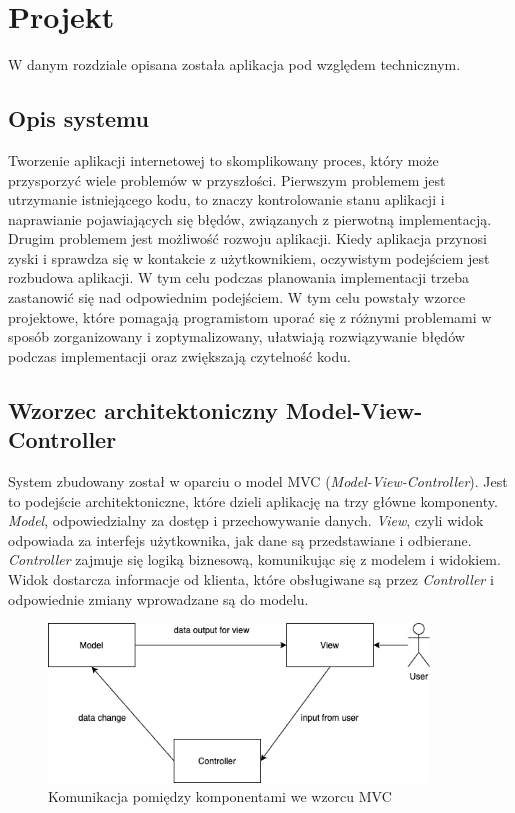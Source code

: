 \chapter{Projekt}
\thispagestyle{chapterBeginStyle}
W danym rozdziale opisana została aplikacja pod względem technicznym. 

\section{Opis systemu}
Tworzenie aplikacji internetowej to skomplikowany proces, który może przysporzyć wiele problemów w przyszłości. Pierwszym problemem jest utrzymanie istniejącego kodu, to znaczy kontrolowanie stanu aplikacji i naprawianie pojawiających się błędów, związanych z pierwotną implementacją. Drugim problemem jest możliwość rozwoju aplikacji. Kiedy aplikacja przynosi zyski i sprawdza się w kontakcie z użytkownikiem, oczywistym podejściem jest rozbudowa aplikacji. W tym celu podczas planowania implementacji trzeba zastanowić się nad odpowiednim podejściem. W tym celu powstały wzorce projektowe, które pomagają programistom uporać się z różnymi problemami w sposób zorganizowany i zoptymalizowany, ułatwiają rozwiązywanie błędów podczas implementacji oraz zwiększają czytelność kodu.

\section{Wzorzec architektoniczny Model-View-Controller}
System zbudowany został w oparciu o model MVC (\textit{Model-View-Controller}).
Jest to podejście architektoniczne, które dzieli aplikację na trzy główne komponenty.
\textit{Model}, odpowiedzialny za dostęp i przechowywanie danych. \textit{View}, czyli widok odpowiada za interfejs użytkownika, jak dane są przedstawiane i odbierane. \textit{Controller} zajmuje się logiką biznesową, komunikując się z modelem i widokiem. Widok dostarcza informacje od klienta, które obsługiwane są przez \textit{Controller} i odpowiednie zmiany wprowadzane są do modelu\cite{6827095}.

\begin{figure}[h]
	
	\centering
	\includegraphics[width=0.90\textwidth]{mvc-diagram}		
	\caption{Komunikacja pomiędzy komponentami we wzorcu MVC }
\end{figure}

